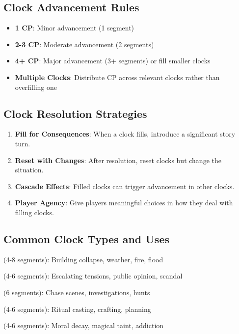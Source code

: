 \documentclass[11pt]{article}
\begin{document}
\subsection*{Clock Advancement Rules}

\begin{itemize}[leftmargin=*]
\item \textbf{1 CP}: Minor advancement (1 segment)
\item \textbf{2-3 CP}: Moderate advancement (2 segments)  
\item \textbf{4+ CP}: Major advancement (3+ segments) or fill smaller clocks
\item \textbf{Multiple Clocks}: Distribute CP across relevant clocks rather than overfilling one
\end{itemize}

\subsection*{Clock Resolution Strategies}

\begin{enumerate}[leftmargin=*]
\item \textbf{Fill for Consequences}: When a clock fills, introduce a significant story turn.
\item \textbf{Reset with Changes}: After resolution, reset clocks but change the situation.
\item \textbf{Cascade Effects}: Filled clocks can trigger advancement in other clocks.
\item \textbf{Player Agency}: Give players meaningful choices in how they deal with filling clocks.
\end{enumerate}

\subsection*{Common Clock Types and Uses}

\begin{description}[leftmargin=*]
\item[Environmental Clocks] (4-8 segments): Building collapse, weather, fire, flood
\item[Social Clocks] (4-6 segments): Escalating tensions, public opinion, scandal  
\item[Pursuit Clocks] (6 segments): Chase scenes, investigations, hunts
\item[Preparation Clocks] (4-6 segments): Ritual casting, crafting, planning
\item[Corruption Clocks] (4-6 segments): Moral decay, magical taint, addiction
\end{description}
\end{document}
